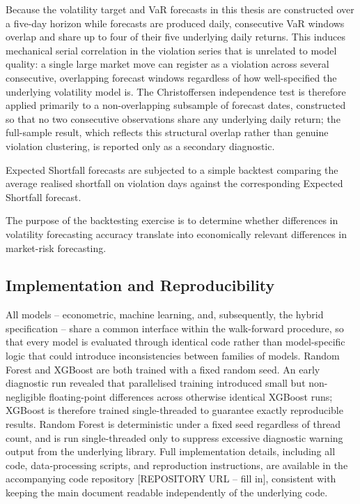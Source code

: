 \documentclass[12pt,a4paper]{article}
\begin{document}
Because the volatility target and VaR forecasts in this thesis are constructed over a five-day
horizon while forecasts are produced daily, consecutive VaR windows overlap and share up to four of
their five underlying daily returns. This induces mechanical serial correlation in the violation
series that is unrelated to model quality: a single large market move can register as a violation
across several consecutive, overlapping forecast windows regardless of how well-specified the
underlying volatility model is. The Christoffersen independence test is therefore applied primarily
to a non-overlapping subsample of forecast dates, constructed so that no two consecutive observations
share any underlying daily return; the full-sample result, which reflects this structural overlap
rather than genuine violation clustering, is reported only as a secondary diagnostic.

Expected Shortfall forecasts are subjected to a simple backtest comparing the average realised
shortfall on violation days against the corresponding Expected Shortfall forecast.

The purpose of the backtesting exercise is to determine whether differences in volatility forecasting
accuracy translate into economically relevant differences in market-risk forecasting.

\subsection{Implementation and Reproducibility}
All models -- econometric, machine learning, and, subsequently, the hybrid specification -- share a
common interface within the walk-forward procedure, so that every model is evaluated through
identical code rather than model-specific logic that could introduce inconsistencies between
families of models. Random Forest and XGBoost are both trained with a fixed random seed. An early
diagnostic run revealed that parallelised training introduced small but non-negligible
floating-point differences across otherwise identical XGBoost runs; XGBoost is therefore trained
single-threaded to guarantee exactly reproducible results. Random Forest is deterministic under a
fixed seed regardless of thread count, and is run single-threaded only to suppress excessive
diagnostic warning output from the underlying library. Full implementation details, including all
code, data-processing scripts, and reproduction instructions, are available in the accompanying
code repository [REPOSITORY URL -- fill in], consistent with keeping the main document readable
independently of the underlying code.
\end{document}
